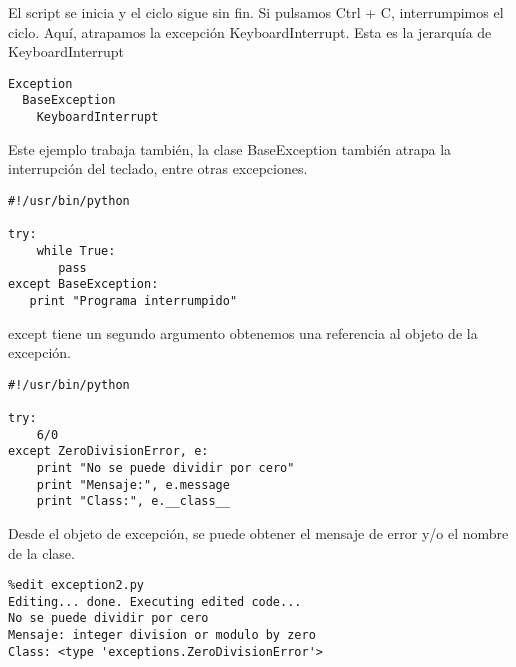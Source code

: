 \documentclass[twoside,10.5pt]{article}%
\begin{document}
El script se inicia y el ciclo sigue sin fin. Si pulsamos Ctrl + C, interrumpimos el ciclo. Aqu\'i, atrapamos la excepci\'on {\color{blue} KeyboardInterrupt}. Esta es la jerarqu\'ia de {\color{blue} KeyboardInterrupt}

\vspace{0.3cm}

\begin{verbatim}
Exception
  BaseException
    KeyboardInterrupt
\end{verbatim}


\vspace{0.3cm}

Este ejemplo trabaja tambi\'en, la clase {\color{blue} BaseException} tambi\'en atrapa la interrupci\'on del teclado, entre otras excepciones.

\begin{verbatim}
#!/usr/bin/python

try:
    while True:
       pass
except BaseException:
   print "Programa interrumpido"
\end{verbatim}

\vspace{0.3cm}


{\color{red}except} tiene un segundo argumento obtenemos una referencia al objeto de la excepci\'on.

\vspace{0.3cm}

\begin{verbatim}
#!/usr/bin/python

try:
    6/0
except ZeroDivisionError, e:
    print "No se puede dividir por cero"
    print "Mensaje:", e.message
    print "Class:", e.__class__
\end{verbatim}

\vspace{0.3cm}

Desde el objeto de excepci\'on, se puede obtener el mensaje de error y/o el nombre de la clase.

\vspace{0.3cm}

\begin{verbatim}
%edit exception2.py
Editing... done. Executing edited code...
No se puede dividir por cero
Mensaje: integer division or modulo by zero
Class: <type 'exceptions.ZeroDivisionError'>
\end{verbatim}


\vspace{0.3cm}
\end{document}
